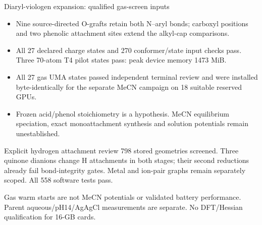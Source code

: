 \begin{frame}{Diaryl-viologen expansion: qualified gas-screen inputs}
  \small
  \begin{itemize}
    \item Nine source-directed O-grafts retain both N--aryl bonds; carboxyl positions
      and two phenolic attachment sites extend the alkyl-cap comparisons.
    \item All 27 declared charge states and 270 conformer/state input checks pass.
      Three 70-atom T4 pilot states pass: peak device memory 1473 MiB.
    \item All 27 gas UMA states passed independent terminal review and were installed
      byte-identically for the separate MeCN campaign on 18 suitable reserved GPUs.
    \item Frozen acid/phenol stoichiometry is a hypothesis. MeCN equilibrium speciation,
      exact monoattachment synthesis and solution potentials remain unestablished.
  \end{itemize}
  \begin{block}{Explicit hydrogen attachment review}
    798 stored geometries screened. Three quinone dianions change H attachments in
    both stages; their second reductions already fail bond-integrity gates.
    Metal and ion-pair graphs remain separately scoped. All 558 software tests pass.
  \end{block}
  \vfill\scriptsize Gas warm starts are not MeCN potentials or validated battery performance.
  Parent aqueous/pH14/AgAgCl measurements are separate. No DFT/Hessian qualification for 16-GB cards.
\end{frame}
